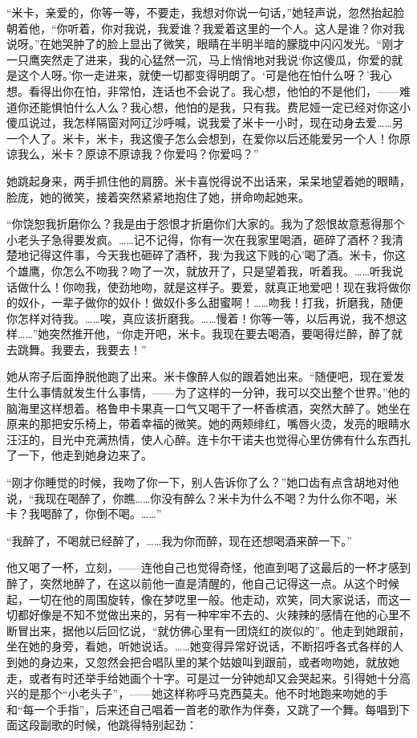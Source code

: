 \par “米卡，亲爱的，你等一等，不要走，我想对你说一句话，”她轻声说，忽然抬起脸朝着他，“你听着，你对我说，我爱谁？我爱着这里的一个人。这人是谁？你对我说呀。”在她哭肿了的脸上显出了微笑，眼睛在半明半暗的朦胧中闪闪发光。“刚才一只鹰突然走了进来，我的心猛然一沉，马上悄悄地对我说‘你这傻瓜，你爱的就是这个人呀。’你一走进来，就使一切都变得明朗了。‘可是他在怕什么呀？’我心想。看得出你在怕，非常怕，连话也不会说了。我心想，他怕的不是他们，——难道你还能惧怕什么人么？我心想，他怕的是我，只有我。费尼娅一定已经对你这小傻瓜说过，我怎样隔窗对阿辽沙呼喊，说我爱了米卡一小时，现在动身去爱……另一个人了。米卡，米卡，我这傻子怎么会想到，在爱你以后还能爱另一个人！你原谅我么，米卡？原谅不原谅我？你爱吗？你爱吗？”
\par 她跳起身来，两手抓住他的肩膀。米卡喜悦得说不出话来，呆呆地望着她的眼睛，脸庞，她的微笑，接着突然紧紧地抱住了她，拼命吻起她来。
\par “你饶恕我折磨你么？我是由于怨恨才折磨你们大家的。我为了怨恨故意惹得那个小老头子急得要发疯。……记不记得，你有一次在我家里喝酒，砸碎了酒杯？我清楚地记得这件事，今天我也砸碎了酒杯，我‘为我这下贱的心’喝了酒。米卡，你这个雄鹰，你怎么不吻我？吻了一次，就放开了，只是望着我，听着我。……听我说话做什么！你吻我，使劲地吻，就是这样子。要爱，就真正地爱吧！现在我将做你的奴仆，一辈子做你的奴仆！做奴仆多么甜蜜啊！……吻我！打我，折磨我，随便你怎样对待我。……唉，真应该折磨我。……慢着！你等一等，以后再说，我不想这样……”她突然推开他，“你走开吧，米卡。我现在要去喝酒，要喝得烂醉，醉了就去跳舞。我要去，我要去！”
\par 她从帘子后面挣脱他跑了出来。米卡像醉人似的跟着她出来。“随便吧，现在爱发生什么事情就发生什么事情，——为了这样的一分钟，我可以交出整个世界。”他的脑海里这样想着。格鲁申卡果真一口气又喝干了一杯香槟酒，突然大醉了。她坐在原来的那把安乐椅上，带着幸福的微笑。她的两颊绯红，嘴唇火烫，发亮的眼睛水汪汪的，目光中充满热情，使人心醉。连卡尔干诺夫也觉得心里仿佛有什么东西扎了一下，他走到她身边来了。
\par “刚才你睡觉的时候，我吻了你一下，别人告诉你了么？”她口齿有点含胡地对他说，“我现在喝醉了，你瞧……你没有醉么？米卡为什么不喝？为什么你不喝，米卡？我喝醉了，你倒不喝。……”
\par “我醉了，不喝就已经醉了，……我为你而醉，现在还想喝酒来醉一下。”
\par 他又喝了一杯，立刻，——连他自己也觉得奇怪，他直到喝了这最后的一杯才感到醉了，突然地醉了，在这以前他一直是清醒的，他自己记得这一点。从这个时候起，一切在他的周围旋转，像在梦呓里一般。他走动，欢笑，同大家说话，而这一切都好像是不知不觉做出来的，另有一种牢牢不去的、火辣辣的感情在他的心里不断冒出来，据他以后回忆说，“就仿佛心里有一团烧红的炭似的”。他走到她跟前，坐在她的身旁，看她，听她说话。……她变得异常好说话，不断招呼各式各样的人到她的身边来，又忽然会把合唱队里的某个姑娘叫到跟前，或者吻吻她，就放她走，或者有时还举手给她画个十字。可是过一分钟她却又会哭起来。引得她十分高兴的是那个“小老头子”，——她这样称呼马克西莫夫。他不时地跑来吻她的手和“每一个手指”，后来还自己唱着一首老的歌作为伴奏，又跳了一个舞。每唱到下面这段副歌的时候，他跳得特别起劲：

